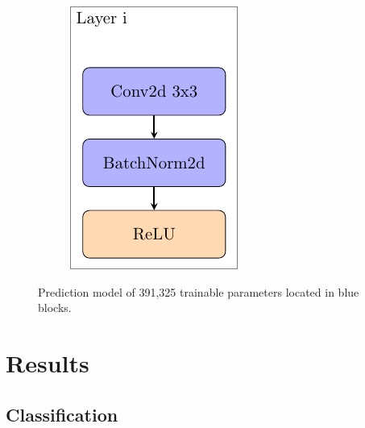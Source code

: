 \documentclass[review]{elsarticle}
\theoremstyle{definition} %
\theoremstyle{remark}
\begin{document}
\begin{figure}[ht!]
{\begin{subfigure}[b]{.30\textwidth}
		\includegraphics[width=\textwidth]{./figures/modellayer.pdf}\\
		\vspace{2cm}
	\end{subfigure}
    }
	\hfill 
	\caption{Prediction model of 391,325 trainable parameters located in blue blocks.}  
	\label{fig:drmodel} 
\end{figure}

\section{Results}\label{sec:results}

\subsection{Classification}
\end{document}
